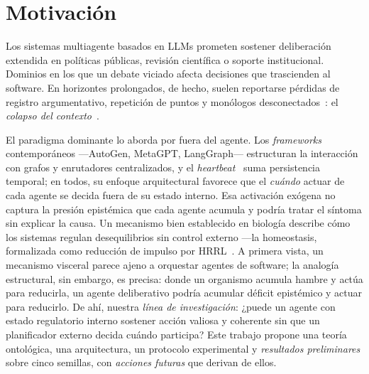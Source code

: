 \documentclass{llncs}
\begin{document}
\clearpage
\setcounter{page}{1}

\section{Motivaci\'on}
\label{sec:motivation}

Los sistemas multiagente basados en LLMs prometen sostener
deliberaci\'on extendida en pol\'iticas p\'ublicas, revisi\'on
cient\'ifica o soporte institucional. Dominios en los que un debate
viciado afecta decisiones que trascienden al software. En horizontes
prolongados, de hecho, suelen reportarse p\'erdidas de registro
argumentativo, repetici\'on de puntos y mon\'ologos
desconectados~\parencite{park2023generative}: el \emph{colapso del
contexto}~\parencite{huang2024masresilience}.

El paradigma dominante lo aborda por fuera del agente. Los
\emph{frameworks} contempor\'aneos ---AutoGen, MetaGPT,
LangGraph--- estructuran la
interacci\'on con grafos y enrutadores centralizados, y el
\emph{heartbeat}~\parencite{openclaw2025heartbeat} suma persistencia
temporal; en todos, su enfoque arquitectural favorece que el
\emph{cu\'ando} actuar de cada agente se decida fuera de su estado
interno. Esa activaci\'on ex\'ogena no captura la
presi\'on epist\'emica que cada agente acumula y podr\'ia tratar el
s\'intoma sin explicar la causa. Un mecanismo bien establecido en
biolog\'ia describe c\'omo los sistemas regulan desequilibrios sin
control externo ---la homeostasis, formalizada como reducci\'on de
impulso por HRRL~\parencite{keramati2014homeostatic}. A primera vista,
un mecanismo visceral parece ajeno a orquestar agentes de software;
la analog\'ia estructural, sin embargo, es precisa: donde un
organismo acumula hambre y act\'ua para reducirla, un agente
deliberativo podr\'ia acumular d\'eficit epist\'emico y actuar para
reducirlo. De ah\'i, nuestra \emph{l\'inea de investigaci\'on}: ¿puede un
agente con estado regulatorio interno sostener acci\'on valiosa y
coherente sin que un planificador externo decida cu\'ando participa?
Este trabajo propone una teor\'ia ontol\'ogica, una arquitectura,
un protocolo experimental y \emph{resultados preliminares} sobre
cinco semillas, con \emph{acciones futuras} que derivan de ellos.

\end{document}
